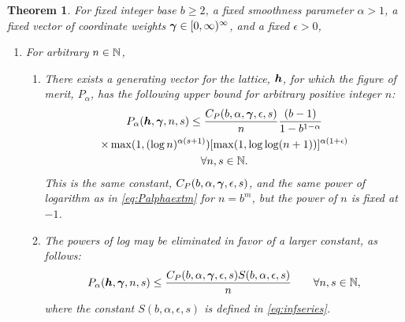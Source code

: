 \documentclass[authoryear]{elsarticle}
\newtheorem{theorem}{Theorem}
\begin{document}
\begin{theorem} \label{thm:one}
    For fixed integer base $b \ge 2$, a fixed smoothness parameter $\alpha > 1$, a fixed vector of coordinate weights $\boldsymbol{\gamma} \in [0,\infty)^\infty$, and a fixed $\epsilon > 0$, 
    
    \begin{enumerate}
    \renewcommand{\labelenumi}{\alph{enumi}.}
        \item For arbitrary $n \in \mathbb{N}$,
        
        \begin{enumerate}
        \renewcommand{\labelenumii}{\roman{enumii}.}
            \item There exists a generating vector for the lattice, $\boldsymbol{h}$, for which the figure of merit, $P_\alpha$, has the following upper bound for arbitrary positive integer $n$:
    \begin{multline} \label{eq:mainresultone}
        P_\alpha(\boldsymbol{h},\boldsymbol{\gamma},n,s) 
        \le \frac {C_{P}(b,\alpha,\boldsymbol{\gamma},\epsilon,s)}{n} \frac{(b-1)}{1 - b^{1-\alpha}} \\
        \times 
  \max(1, (\log n)^{\alpha(s+1)})
      [\max(1,\log \log (n+1))]^{\alpha(1+\epsilon)} \\
      \forall n , s \in \mathbb{N}.
    \end{multline}
    This is the same  constant, $C_{P}(b,\alpha,\boldsymbol{\gamma},\epsilon,s)$, and the same power of logarithm as in \eqref{eq:Palphaextm} for $n = b^{m}$, but the power of $n$ is fixed at $-1$.

    \item The powers of log may be eliminated in favor of a larger constant, as follows:
    \begin{equation} \label{eq:mainresultoneb}
        P_\alpha(\boldsymbol{h},\boldsymbol{\gamma},n,s) 
        \le \frac {C_{P}(b,\alpha,\boldsymbol{\gamma},\epsilon,s) S(b, \alpha, \epsilon, s)}{n} \qquad
      \forall n , s \in \mathbb{N},
    \end{equation}
    where the constant $S(b, \alpha, \epsilon, s)$ is defined in \eqref{eq:infseries}.

    \end{enumerate}


\end{enumerate}
\end{theorem}
\end{document}
